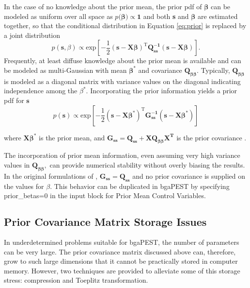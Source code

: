 \documentclass[11pt,oneside,onecolumn]{usgsreport}
\begin{document}
\begin{appendix}
In the case of no knowledge about the prior mean, the prior pdf of
$\mathbf{\beta}$ can be modeled as uniform over all space as $p(\mathbf{\beta)\propto1}$
and both \textbf{s} and $\mathbf{\beta}$ are estimated together,
so that the conditional distribution in Equation \ref{eq:prior} is
replaced by a joint distribution
\[
p(\mathbf{s},\beta)\propto\mathrm{exp\left[\mathbf{-}\frac{1}{2}(\mathbf{s-X\beta})^{T}\mathbf{Q_{ss}^{-1}}(\mathbf{s-X\beta})\right]}.
\]
 Frequently, at least diffuse knowledge about the prior mean is available
and can be modeled as multi-Gaussian with mean $\mathbf{\beta^{*}}$
and covariance $\mathbf{Q_{\beta\beta}}$. Typically, $\mathbf{Q_{\beta\beta}}$
is modeled as a diagonal matrix with variance values on the diagonal
indicating independence among the $\beta^{*}$. Incorporating the
prior information yields a prior pdf for $\mathbf{s}$
\begin{equation}
p(\mathbf{s})\propto\mathrm{exp\left[\mathbf{-}\frac{1}{2}(\mathbf{s-X\beta}^{*})^{T}\mathbf{G_{\mathbf{ss}}^{-1}}(\mathbf{s-X\beta^{*}})\right]}\label{eq:final_prior}
\end{equation}


where $\mathbf{X\beta^{*}}$ is the prior mean, and $\mathbf{G_{ss}=Q_{ss}+XQ_{\beta\beta}X^{\mathbf{T}}}$
is the prior covariance \citep{NowakCirpka2004}.

The incorporation of prior mean information, even assuming very high
variance values in $\mathbf{Q_{\beta\beta},}$ can provide numerical
stability without overly biasing the results. In the original formulations
of \citet{KitanidisVomvoris1983,HoeksemaKitanidis1984a,Kitanidis1995},
$\mathbf{G_{ss}}=\mathbf{Q_{ss}}$ and no prior covariance is supplied
on the values for $\beta.$ This behavior can be duplicated in bgaPEST
by specifying prior\_betas=0 in the input block for Prior Mean Control
Variables.


\subsection{Prior Covariance Matrix Storage Issues}

In underdetermined problems suitable for bgaPEST, the number of parameters
can be very large. The prior covariance matrix discussed above can,
therefore, grow to such large dimensions that it cannot be practically
stored in computer memory. However, two techniques are provided to
alleviate some of this storage stress: compression and Toeplitz transformation.


\end{appendix}
\end{document}
